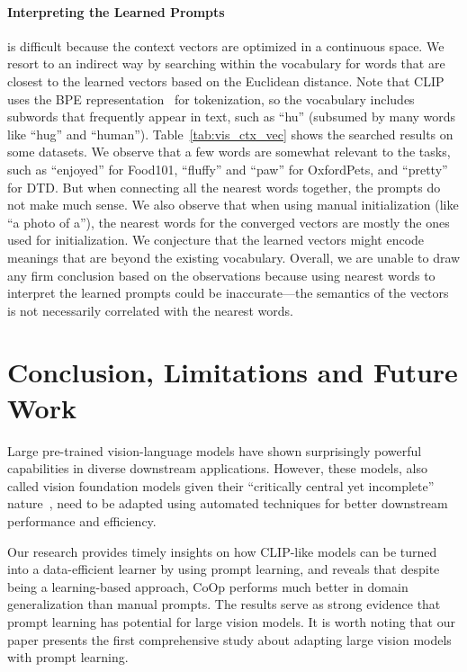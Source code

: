 \paragraph{Interpreting the Learned Prompts}
is difficult because the context vectors are optimized in a continuous space. We resort to an indirect way by searching within the vocabulary for words that are closest to the learned vectors based on the Euclidean distance. Note that CLIP~\citep{radford2021learning} uses the BPE representation~\citep{sennrich2016neural} for tokenization, so the vocabulary includes subwords that frequently appear in text, such as ``hu'' (subsumed by many words like ``hug'' and ``human''). Table~\ref{tab:vis_ctx_vec} shows the searched results on some datasets. We observe that a few words are somewhat relevant to the tasks, such as ``enjoyed'' for Food101, ``fluffy'' and ``paw'' for OxfordPets, and ``pretty'' for DTD. But when connecting all the nearest words together, the prompts do not make much sense. We also observe that when using manual initialization (like ``a photo of a''), the nearest words for the converged vectors are mostly the ones used for initialization. We conjecture that the learned vectors might encode meanings that are beyond the existing vocabulary. Overall, we are unable to draw any firm conclusion based on the observations because using nearest words to interpret the learned prompts could be inaccurate---the semantics of the vectors is not necessarily correlated with the nearest words.


\section{Conclusion, Limitations and Future Work}
Large pre-trained vision-language models have shown surprisingly powerful capabilities in diverse downstream applications. However, these models, also called vision foundation models given their ``critically central yet incomplete'' nature~\citep{bommasani2021opportunities}, need to be adapted using automated techniques for better downstream performance and efficiency.

Our research provides timely insights on how CLIP-like models can be turned into a data-efficient learner by using prompt learning, and reveals that despite being a learning-based approach, CoOp performs much better in domain generalization than manual prompts. The results serve as strong evidence that prompt learning has potential for large vision models. It is worth noting that our paper presents the first comprehensive study about adapting large vision models with prompt learning.

